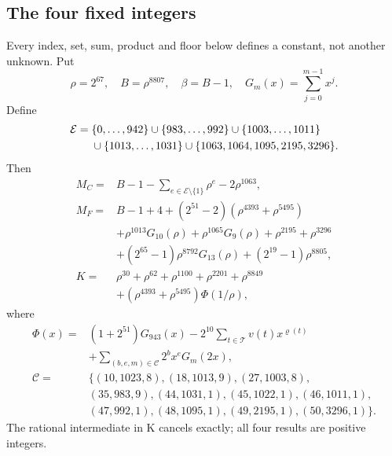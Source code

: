 \subsection*{The four fixed integers}
Every index, set, sum, product and floor below defines a constant, not
another unknown. Put
\[
\rho=2^{67},\quad B=\rho^{8807},\quad\beta=B-1,\quad
G_m(x)=\sum_{j=0}^{m-1}x^j.
\]
Define
\[
\begin{split}
\mathcal E={}&\{0,\ldots,942\}\cup\{983,\ldots,992\}\cup\{1003,\ldots,1011\}\\
&\cup\{1013,\ldots,1031\}\cup\{1063,1064,1095,2195,3296\}.
\end{split}
\]
Then
\begin{align*}
M_C={}&B-1-\sum_{e\in\mathcal E\setminus\{1\}}\rho^e-2\rho^{1063},\\
M_F={}&B-1+4+(2^{51}-2)(\rho^{4393}+\rho^{5495})\\
&+\rho^{1013}G_{10}(\rho)+\rho^{1065}G_9(\rho)
  +\rho^{2195}+\rho^{3296}\\
&+(2^{65}-1)\rho^{8792}G_{13}(\rho)+(2^{19}-1)\rho^{8805},\\
K={}&\rho^{30}+\rho^{62}+\rho^{1100}+\rho^{2201}+\rho^{8849}\\
&+(\rho^{4393}+\rho^{5495})\Phi(1/\rho),
\end{align*}
where
\[
\begin{split}
\Phi(x)={}&(1+2^{51})G_{943}(x)
 -2^{10}\sum_{t\in\mathcal T}v(t)x^{\varrho(t)}\\
&+\sum_{(b,e,m)\in\mathcal C}2^b x^e G_m(2x),\\
\mathcal C={}&\{(10,1023,8),(18,1013,9),(27,1003,8),\\
&(35,983,9),(44,1031,1),(45,1022,1),(46,1011,1),\\
&(47,992,1),(48,1095,1),(49,2195,1),(50,3296,1)\}.
\end{split}
\]
The rational intermediate in K cancels exactly; all four results are positive integers.

